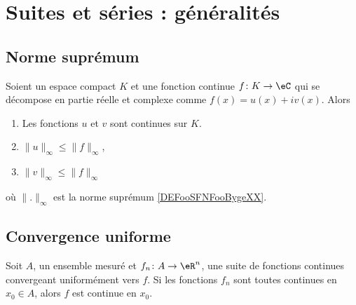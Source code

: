 
\section{Suites et séries : généralités}
\label{SECooTDZNooJvjPks}

\subsection{Norme suprémum}


\begin{lemma}       \label{LEMooLPRZooUPsWTR}
	Soient un espace compact \( K\) et une fonction continue \( f\colon K\to \eC\) qui se décompose en partie réelle et complexe comme \( f(x)=u(x)+iv(x)\). Alors
	\begin{enumerate}
		\item
		      Les fonctions \( u\) et \( v\) sont continues sur \( K\).
		\item
		      \( \| u \|_{\infty}\leq \| f \|_{\infty}\),
		\item
		      \( \| v \|_{\infty}\leq \| f \|_{\infty}\)
	\end{enumerate}
	où \( \| . \|_{\infty}\) est la norme suprémum \ref{DEFooSFNFooBygeXX}.
\end{lemma}

\subsection{Convergence uniforme}


\begin{theorem}			\label{ThoUnigCvCont}
	Soit \( A\), un ensemble mesuré et \( f_n\colon A\to \eR^n\), une suite de fonctions continues convergeant uniformément vers \( f\). Si les fonctions \( f_n\) sont toutes continues en \( x_0\in A\), alors \( f\) est continue en \( x_0\).
\end{theorem}

